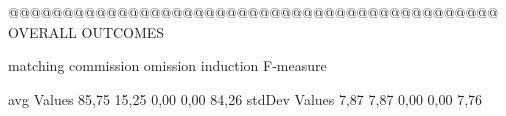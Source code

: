  @@@@@@@@@@@@@@@@@@@@@@@@@@@@@@@@@@@@@@@@@@@@@ OVERALL OUTCOMES

                matching commission   omission  induction   F-measure

avg Values       85,75       15,25       0,00       0,00       84,26        
stdDev Values    7,87        7,87      0,00       0,00        7,76        
